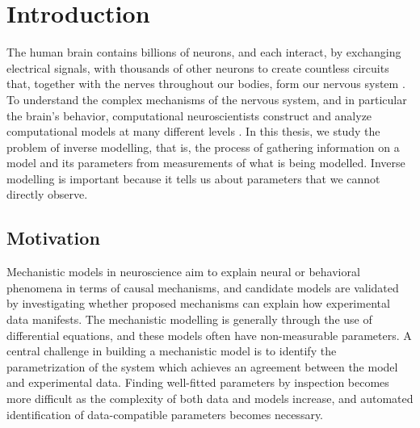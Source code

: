 \chapter{Introduction}


The human brain contains billions of neurons, and each interact, by exchanging electrical signals, with thousands of other neurons to create countless circuits that, together with the nerves throughout our bodies, form our nervous system \cite{BrainFacts}. To understand the complex mechanisms of the nervous system, and in particular the brain's behavior, computational neuroscientists construct and analyze computational models at many different levels \cite{Sterratt}. In this thesis, we study the problem of inverse modelling, that is, the process of gathering information on a model and its parameters from measurements of what is being modelled. Inverse modelling is important because it tells us about parameters that we cannot directly observe. 

\section{Motivation}\label{sec:Motivation}

Mechanistic models in neuroscience aim to explain neural or behavioral phenomena in terms of causal mechanisms, and candidate models are validated by investigating whether proposed mechanisms can explain how experimental data manifests. The mechanistic modelling is generally through the use of differential equations, and these models often have non-measurable parameters. A central challenge in building a mechanistic model is to identify the parametrization of the system which achieves an agreement between the model and experimental data. Finding well-fitted parameters by inspection becomes more difficult as the complexity of both data and models increase, and automated identification of data-compatible parameters becomes necessary. 

